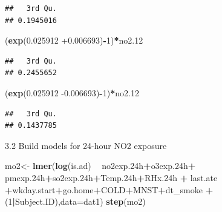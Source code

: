 \documentclass[12pt,]{article}
\newenvironment{Shaded}{\begin{snugshade}}{\end{snugshade}}
\newcommand{\DataTypeTok}[1]{\textcolor[rgb]{0.13,0.29,0.53}{#1}}
\newcommand{\DecValTok}[1]{\textcolor[rgb]{0.00,0.00,0.81}{#1}}
\newcommand{\FloatTok}[1]{\textcolor[rgb]{0.00,0.00,0.81}{#1}}
\newcommand{\KeywordTok}[1]{\textcolor[rgb]{0.13,0.29,0.53}{\textbf{#1}}}
\newcommand{\NormalTok}[1]{#1}
\newcommand{\OperatorTok}[1]{\textcolor[rgb]{0.81,0.36,0.00}{\textbf{#1}}}
\newcommand{\StringTok}[1]{\textcolor[rgb]{0.31,0.60,0.02}{#1}}
\begin{document}
\begin{verbatim}
##   3rd Qu. 
## 0.1945016
\end{verbatim}

\begin{Shaded}
\begin{Highlighting}[]
\NormalTok{(}\KeywordTok{exp}\NormalTok{(}\FloatTok{0.025912} \FloatTok{+0.006693}\NormalTok{)}\OperatorTok{-}\DecValTok{1}\NormalTok{)}\OperatorTok{*}\NormalTok{no2}\FloatTok{.12}
\end{Highlighting}
\end{Shaded}

\begin{verbatim}
##   3rd Qu. 
## 0.2455652
\end{verbatim}

\begin{Shaded}
\begin{Highlighting}[]
\NormalTok{(}\KeywordTok{exp}\NormalTok{(}\FloatTok{0.025912} \FloatTok{-0.006693}\NormalTok{)}\OperatorTok{-}\DecValTok{1}\NormalTok{)}\OperatorTok{*}\NormalTok{no2}\FloatTok{.12}
\end{Highlighting}
\end{Shaded}

\begin{verbatim}
##   3rd Qu. 
## 0.1437785
\end{verbatim}

3.2 Build models for 24-hour NO2 exposure

\begin{Shaded}
\begin{Highlighting}[]
\NormalTok{mo2<-}\StringTok{ }\KeywordTok{lmer}\NormalTok{(}\KeywordTok{log}\NormalTok{(is.ad) }\OperatorTok{~}\StringTok{ }\NormalTok{no2exp}\FloatTok{.24}\NormalTok{h}\OperatorTok{+}\NormalTok{o3exp}\FloatTok{.24}\NormalTok{h}\OperatorTok{+}\StringTok{ }\NormalTok{pmexp}\FloatTok{.24}\NormalTok{h}\OperatorTok{+}\NormalTok{so2exp}\FloatTok{.24}\NormalTok{h}\OperatorTok{+}\NormalTok{Temp}\FloatTok{.24}\NormalTok{h}\OperatorTok{+}\NormalTok{RHx}\FloatTok{.24}\NormalTok{h }\OperatorTok{+}\StringTok{ }\NormalTok{last.ate }\OperatorTok{+}\NormalTok{wkday.start}\OperatorTok{+}\NormalTok{go.home}\OperatorTok{+}\NormalTok{COLD}\OperatorTok{+}\NormalTok{MNST}\OperatorTok{+}\NormalTok{dt_smoke }\OperatorTok{+}\NormalTok{(}\DecValTok{1}\OperatorTok{|}\NormalTok{Subject.ID),}\DataTypeTok{data=}\NormalTok{dat1)}
\KeywordTok{step}\NormalTok{(mo2)}
\end{Highlighting}
\end{Shaded}
\end{document}
